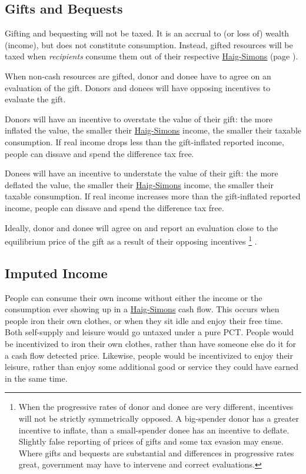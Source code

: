 \subsection{Gifts and Bequests} Gifting and bequesting will not be taxed.
It is an accrual to (or loss of) wealth (income), but does not constitute consumption.
Instead, gifted resources will be taxed when \emph{recipients} consume them out of their respective \hyperref[eq:HaigSimonsPCT]{Haig-Simons} (page \pageref{eq:HaigSimonsPCT}).

When non-cash resources are gifted, donor and donee have to agree on an evaluation of the gift.
Donors and donees will have opposing incentives to evaluate the gift.

Donors will have an incentive to overstate the value of their gift:
the more inflated the value, the smaller their \hyperref[eq:HaigSimonsPCT]{Haig-Simons} income, the smaller their taxable consumption.
If real income drops less than the gift-inflated reported income, people can dissave and spend the difference tax free.

Donees will have an incentive to understate the value of their gift:
the more deflated the value, the smaller their \hyperref[eq:HaigSimonsPCT]{Haig-Simons} income, the smaller their taxable consumption.
If real income increases more than the gift-inflated reported income, people can dissave and spend the difference tax free.

Ideally, donor and donee will agree on and report an evaluation close to the equilibrium price of the gift as a result of their opposing incentives
\footnote{
	When the progressive rates of donor and donee are very different, incentives will not be strictly symmetrically opposed.
	A big-spender donor has a greater incentive to inflate, than a small-spender donee has an incentive to deflate.
	Slightly false reporting of prices of gifts and some tax evasion may ensue.
	Where gifts and bequests are substantial and differences in progressive rates great, government may have to intervene and correct evaluations.
}
.

\subsection{Imputed Income} People can consume their own income without either the income or the consumption ever showing up in a \hyperref[eq:HaigSimonsPCT]{Haig-Simons} cash flow.
This occurs when people iron their own clothes, or when they sit idle and enjoy their free time.
Both self-supply and leisure would go untaxed under a pure PCT.
People would be incentivized to iron their own clothes, rather than have someone else do it for a cash flow detected price.
Likewise, people would be incentivized to enjoy their leisure, rather than enjoy some additional good or service they could have earned in the same time.

